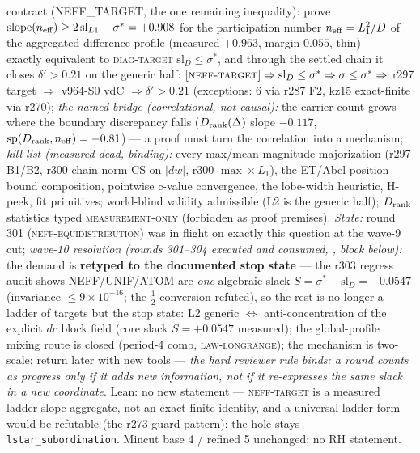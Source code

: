 \documentclass[11pt,a4paper]{article}
\begin{document}
{{contract (NEFF\_TARGET, the one remaining inequality):} prove
$\mathrm{slope}(n_{\rm eff}) \ge 2\,\mathrm{sl}_{L1} - \sigma^* =
+0.908$ for the participation number $n_{\rm eff} = L_1^2/D$ of
the aggregated difference profile (measured $+0.963$, margin
$0.055$, thin) --- exactly equivalent to \textsc{diag-target}
$\mathrm{sl}_D \le \sigma^*$, and through the settled chain it
closes $\delta' > 0.21$ on the generic half:
$[\textsc{neff-target}] \Rightarrow \mathrm{sl}_D \le \sigma^*
\Rightarrow \sigma \le \sigma^* \Rightarrow$ r297 target
$\Rightarrow$ v964-S0 vdC $\Rightarrow \delta' > 0.21$
(exceptions: 6 via r287 F2, kz15 exact-finite via r270);
\emph{the named bridge (correlational, not causal):} the carrier
count grows where the boundary discrepancy falls
($D_{\rm rank}(\Delta)$ slope $-0.117$,
$\mathrm{sp}(D_{\rm rank}, n_{\rm eff}) = -0.81$) --- a proof must
turn the correlation into a mechanism; \emph{kill list (measured
dead, binding):} every max/mean magnitude majorization (r297
B1/B2, r300 chain-norm CS on $|dw|$, r300 $\max\times L_1$), the
ET/Abel position-bound composition, pointwise c-value convergence,
the lobe-width heuristic, H-peek, fit primitives; world-blind
validity admissible (L2 is the generic half); $D_{\rm rank}$
statistics typed \textsc{measurement-only} (forbidden as proof
premises).  \emph{State:} round 301
(\textsc{neff-equidistribution}) was in flight on exactly this
question at the wave-9 cut; \emph{wave-10 resolution (rounds
301--304 executed and consumed,
, block below):} the demand
is \textbf{retyped to the documented stop state} --- the r303
regress audit shows NEFF/UNIF/ATOM are \emph{one} algebraic
slack $S = \sigma^* - \mathrm{sl}_D = +0.0547$ (invariance $\le
9\times10^{-16}$; the $\tfrac12$-conversion refuted), so the
rest is no longer a ladder of targets but the stop state: L2
generic $\Leftrightarrow$ anti-concentration of the explicit
$dc$ block field (core slack $S = +0.0547$ measured); the
global-profile mixing route is closed (period-4 comb,
\textsc{law-longrange}); the mechanism is two-scale; return
later with new tools --- \emph{the hard reviewer rule binds: a
round counts as progress only if it adds new information, not
if it re-expresses the same slack in a new coordinate}.
Lean: no new statement --- \textsc{neff-target} is a measured
ladder-slope aggregate, not an exact finite identity, and a
universal ladder form would be refutable (the r273 guard pattern);
the hole stays \texttt{lstar\_subordination}.  Mincut base 4 /
refined 5 unchanged; no RH statement.\par}
\end{document}
